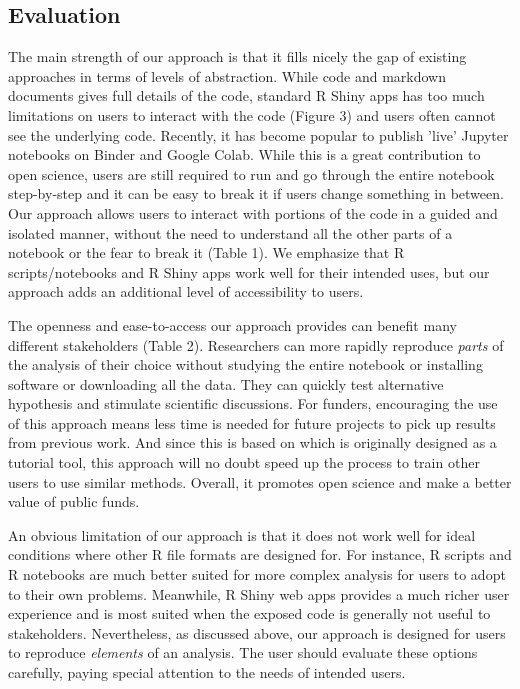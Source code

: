 \hypertarget{evaluation}{%
\subsection{Evaluation}\label{evaluation}}

The main strength of our approach is that it fills nicely the gap of
existing approaches in terms of levels of abstraction. While code and
markdown documents gives full details of the code, standard R Shiny apps
has too much limitations on users to interact with the code (Figure 3)
and users often cannot see the underlying code. Recently, it has become
popular to publish 'live' Jupyter notebooks on Binder and Google Colab.
While this is a great contribution to open science, users are still
required to run and go through the entire notebook step-by-step and
it can be easy to break it if users change something in between. Our
approach allows users to interact with portions of the code in a guided
and isolated manner, without the need to understand all the other parts
of a notebook or the fear to break it (Table 1). We emphasize that R
scripts/notebooks and R Shiny apps work well for their intended uses,
but our approach adds an additional level of accessibility to users.

The openness and ease-to-access our approach provides can benefit many
different stakeholders (Table 2). Researchers can more rapidly reproduce
\textit{parts} of the analysis of their choice without studying the entire
notebook or installing software or downloading all the data. They can
quickly test alternative hypothesis and stimulate scientific
discussions. For funders, encouraging the use of this approach means
less time is needed for future projects to pick up results from previous
work. And since this is based on  which is originally
designed as a tutorial tool, this approach will no doubt speed up the
process to train other users to use similar methods. Overall, it
promotes open science and make a better value of public funds.

An obvious limitation of our approach is that it does not work well for
ideal conditions where other R file formats are designed for. For
instance, R scripts and R notebooks are much better suited for more
complex analysis for users to adopt to their own problems. Meanwhile, R
Shiny web apps provides a much richer user experience and is most suited
when the exposed code is generally not useful to stakeholders.
Nevertheless, as discussed above, our approach is designed for users to
reproduce \textit{elements} of an analysis. The user should evaluate these
options carefully, paying special attention to the needs of intended
users.

